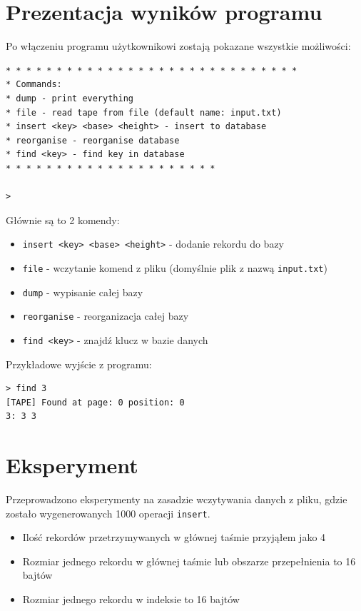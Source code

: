 \documentclass[
]{article}
\providecommand{\tightlist}{%
  \setlength{\itemsep}{0pt}\setlength{\parskip}{0pt}}
\begin{document}
\section{Prezentacja wyników
programu}\label{prezentacja-wynikuxf3w-programu}

Po włączeniu programu użytkownikowi zostają pokazane wszystkie
możliwości:

\begin{verbatim}
* * * * * * * * * * * * * * * * * * * * * * * * * * * * *
* Commands:
* dump - print everything
* file - read tape from file (default name: input.txt)
* insert <key> <base> <height> - insert to database
* reorganise - reorganise database
* find <key> - find key in database
* * * * * * * * * * * * * * * * * * * * *

>
\end{verbatim}

Głównie są to 2 komendy:

\begin{itemize}
\tightlist
\item
  \texttt{insert\ \textless{}key\textgreater{}\ \textless{}base\textgreater{}\ \textless{}height\textgreater{}}
  - dodanie rekordu do bazy
\item
  \texttt{file} - wczytanie komend z pliku (domyślnie plik z nazwą
  \texttt{input.txt})
\item
  \texttt{dump} - wypisanie całej bazy
\item
  \texttt{reorganise} - reorganizacja całej bazy
\item
  \texttt{find\ \textless{}key\textgreater{}} - znajdź klucz w bazie
  danych
\end{itemize}

Przykładowe wyjście z programu:

\begin{verbatim}
> find 3
[TAPE] Found at page: 0 position: 0
3: 3 3
\end{verbatim}

\section{Eksperyment}\label{eksperyment}

Przeprowadzono eksperymenty na zasadzie wczytywania danych z pliku,
gdzie zostało wygenerowanych 1000 operacji \texttt{insert}.

\begin{itemize}
\tightlist
\item
  Ilość rekordów przetrzymywanych w głównej taśmie przyjąłem jako 4
\item
  Rozmiar jednego rekordu w głównej taśmie lub obszarze przepełnienia to
  16 bajtów
\item
  Rozmiar jednego rekordu w indeksie to 16 bajtów
\end{itemize}
\end{document}
